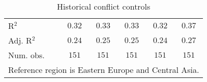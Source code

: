 \begin{table}[H]
\begin{center}
{\begin{tabular}{l c c c c c}
\hline
R$^2$                                                  & $0.32$      & $0.33$      & $0.33$      & $0.32$      & $0.37$         \\
Adj. R$^2$                                             & $0.24$      & $0.25$      & $0.25$      & $0.24$      & $0.27$         \\
Num. obs.                                              & $151$       & $151$       & $151$       & $151$       & $151$          \\
\hline
\multicolumn{6}{l}{\scriptsize{Reference region is Eastern Europe and Central Asia.}}
\end{tabular}
}
\caption{Historical conflict controls}
\label{Tab: Hist_Conflict_Rob}
\end{center}
\end{table}
